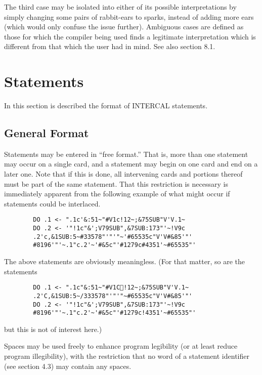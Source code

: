 The third case may be isolated into either of its possible interpretations
by simply changing some pairs of rabbit-ears to sparks, instead of adding
more ears (which would only confuse the issue further).  Ambiguous cases
are defined as those for which the compiler being used finds a legitimate
interpretation which is different from that which the user had in mind.
See also section 8.1.






\section{Statements}

In this section is described the format of INTERCAL statements.

\subsection{General Format}

Statements may be entered in ``free format.''  That is, more than one
statement may occur on a single card, and a statement may begin on one card
and end on a later one.  Note that if this is done, all intervening cards
and portions thereof must be part of the same statement.  That this
restriction is necessary is immediately apparent from the following example
of what might occur if statements could be interlaced.

\begin{verbatim} 
        DO .1 <- ".1c'&:51~"#V1c!12~;&75SUB"V'V.1~
        DO .2 <- '"!1c"&';V79SUB",&7SUB:173"'~!V9c
        .2'c,&1SUB:5~#33578"'"'"~'#65535c"V'V#&85'"'
        #8196'"'~.1"c.2'~'#&5c"'#1279c#4351'~#65535"'
\end{verbatim} 
The above statements are obviously meaningless.  (For that matter, so are
the statements

\begin{verbatim}
        DO .1 <- ".1c"&:51~"#V1C!12~;&75SUB"V'V.1~
        .2'C,&1SUB:5~/333578"'"'"~#65535c"V'V#&85'"'
        DO .2 <- '"!1c"&';V79SUB",&7SUB:173"'~!V9c
        #8196'"'~.1"c.2'~'#&5c"'#1279c!4351'~#65535"'
\end{verbatim}
but this is not of interest here.)

Spaces may be used freely to enhance program legibility (or at least reduce
program illegibility), with the restriction that no word of a statement
identifier (see section 4.3) may contain any spaces.

